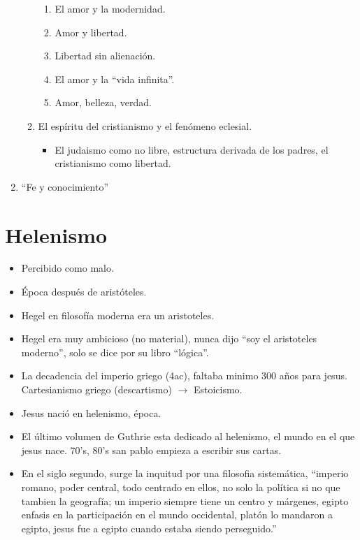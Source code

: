 \begin{enumerate}
\begin{enumerate}
\begin{itemize}
{                        }
                \end{itemize}
                \begin{enumerate}
                    \item El amor y la modernidad. 
                    \item Amor y libertad. 
                    \item Libertad sin alienación. 
                    \item El amor y la ``vida infinita''.
                    \item Amor, belleza, verdad. 
                \end{enumerate}
            \item El espíritu del cristianismo y el fenómeno eclesial.
                \begin{itemize}
                    \item El judaismo como no libre, estructura derivada de los padres, el cristianismo como libertad. 
                \end{itemize}
        \end{enumerate}
    
    \item ``Fe y conocimiento''
\end{enumerate}

\section{Helenismo}
\begin{itemize}
    \item Percibido como malo.
    \item Época después de aristóteles. 
    \item Hegel en filosofía moderna era un aristoteles. 
    \item Hegel era muy ambicioso (no material), nunca dijo ``soy el aristoteles moderno'', solo se dice por su libro ``lógica''.
    \item La decadencia del imperio griego (4ac), faltaba minimo 300 años para jesus. Cartesianismo griego (descartismo) $\rightarrow$ Estoicismo. 
    \item Jesus nació en helenismo, época.
    \item El último volumen de Guthrie esta dedicado al helenismo, el mundo en el que jesus nace. 70's, 80's san pablo empieza a escribir sus cartas. 
    \item En el siglo segundo, surge la inquitud por una filosofia sistemática, ``imperio romano, poder central, todo centrado en ellos, no solo la política si no que tambien la geografía; un imperio siempre tiene un centro y márgenes, egipto enfasis en la participación en el mundo occidental, platón lo mandaron a egipto, jesus fue a egipto cuando estaba siendo perseguido.''
\end{itemize}

